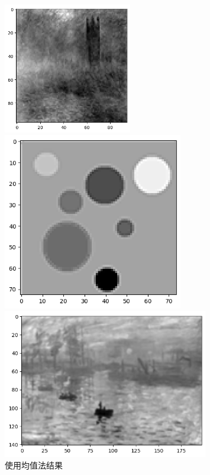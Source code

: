 \documentclass{article}
\begin{document}
\begin{figure}[htbp]
	\centering
		\begin{minipage}[c]{0.3\textwidth} %
			\centering
			\includegraphics[width=0.5\textwidth]{./report/output11.png} %
			
		\end{minipage}%
		\begin{minipage}[c]{0.2\textwidth}
			\centering
			\includegraphics[width=0.7\textwidth]{./report/output12.png}
			
		\end{minipage}
		\begin{minipage}[c]{0.2\textwidth}
			\centering
			\includegraphics[width=0.8\textwidth]{./report/output13.png}
	
		\end{minipage}
		\caption*{使用均值法结果}
\end{figure}
\end{document}
